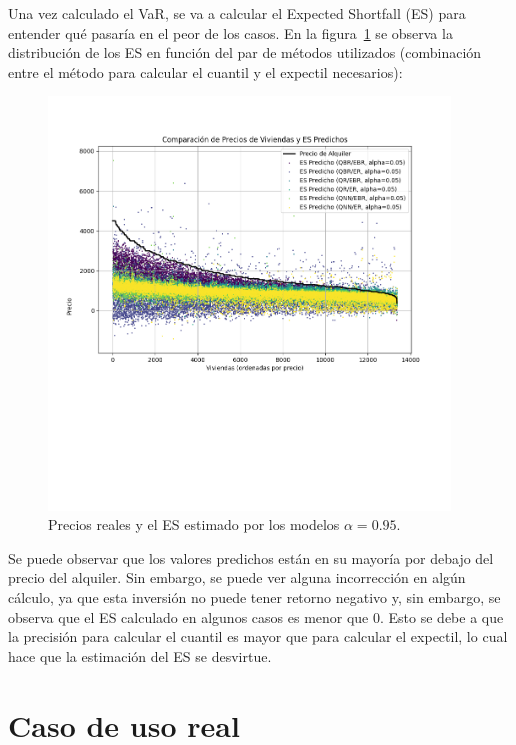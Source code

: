 \documentclass[11pt]{book}
\theoremstyle{plain} %
\theoremstyle{definition} %
\begin{document}
Una vez calculado el VaR, se va a calcular el Expected Shortfall (ES) para 
entender qué pasaría en el peor de los casos. En la figura~\ref{fig:es_predictions} se observa la 
distribución de los ES en función del par de métodos utilizados (combinación entre el método para calcular el cuantil y el expectil necesarios):
\newpage
\begin{figure}[H]
   \centering
   \includegraphics[width=0.95\textwidth]{es_predictions.png}
   \caption{Precios reales y el ES estimado por los modelos $\alpha=0.95$.}
   \label{fig:es_predictions}
\end{figure}

Se puede observar que los valores predichos están en su mayoría por debajo del precio del alquiler. Sin embargo, se puede ver alguna incorrección en algún cálculo, ya que esta inversión no puede tener retorno negativo y, sin embargo, se observa que el ES calculado en algunos casos es menor que 0. Esto se debe a que la precisión para calcular el cuantil es mayor que para calcular el expectil, lo cual hace que la estimación del ES se desvirtue.\\



\section{Caso de uso real}
\end{document}
